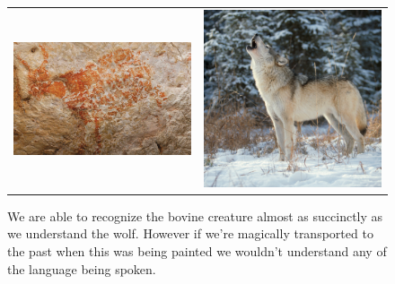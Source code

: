 \begin{figure}[ht!]
	\centering
	\begin{tabular}{cc}
		\includegraphics[width=0.49\linewidth]{figures/intro/cave_painting_of_bull.jpeg} &
		\includegraphics[width=0.31\linewidth]{figures/intro/wolf_nyt.jpeg}
		\\
	\end{tabular}	
	\caption[Efficacy of visual communication]{
		We are able to recognize the bovine creature almost as succinctly as we understand the wolf. However if we're magically transported to the past when this was being painted we wouldn't understand any of the language being spoken.
		}
	\label{fig:cave_painting}
\end{figure}
